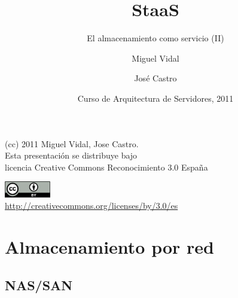 \documentclass{beamer}
\begin{document}
\title{StaaS}
\subtitle{El almacenamiento como servicio (II)}
\author{Miguel Vidal \and José Castro}
\date[CASUL 2011]{Curso de Arquitectura de Servidores, 2011}


\begin{frame}
  \vspace{2cm}
  \begin{flushright}
    {\small (cc) 2011 Miguel Vidal, Jose Castro.} \\
    \medskip
    {\scriptsize Esta presentación se distribuye bajo \\ licencia Creative Commons Reconocimiento 3.0 España}
  \end{flushright}
  \begin{center}
    \href{http://creativecommons.org/licenses/by/3.0/es}{\includegraphics[width=2cm]{format/cc-by.png}} \\
    {\tiny \url{http://creativecommons.org/licenses/by/3.0/es}}
  \end{center}
\end{frame}%


\usebackgroundtemplate{}



\section{Almacenamiento por red}

\subsection{NAS/SAN}
\end{document}
